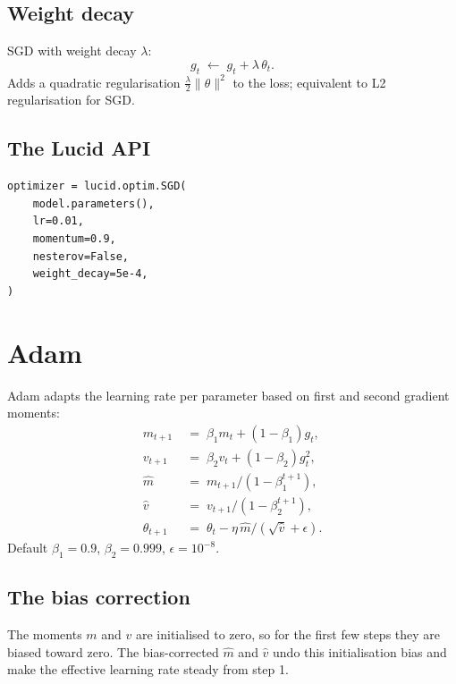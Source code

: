 \subsection{Weight decay}
\label{ssec:optimizers:weight_decay}

SGD with weight decay $\lambda$:
\[
g_t \;\leftarrow\; g_t + \lambda\, \theta_t.
\]
Adds a quadratic regularisation $\frac{\lambda}{2} \|\theta\|^2$
to the loss; equivalent to L2 regularisation for SGD.

\subsection{The Lucid API}
\label{ssec:optimizers:sgd_api}

\begin{lstlisting}[style=lucid,language=LucidPython]
optimizer = lucid.optim.SGD(
    model.parameters(),
    lr=0.01,
    momentum=0.9,
    nesterov=False,
    weight_decay=5e-4,
)
\end{lstlisting}

\section{Adam}
\label{sec:optimizers:adam}

Adam \cite{kingma_adam_2015} adapts the learning rate per
parameter based on first and second gradient moments:
\begin{align*}
m_{t+1} &\;=\; \beta_1 m_t + (1 - \beta_1) g_t, \\
v_{t+1} &\;=\; \beta_2 v_t + (1 - \beta_2) g_t^2, \\
\hat m  &\;=\; m_{t+1} / (1 - \beta_1^{t+1}), \\
\hat v  &\;=\; v_{t+1} / (1 - \beta_2^{t+1}), \\
\theta_{t+1} &\;=\; \theta_t - \eta\, \hat m / (\sqrt{\hat v} + \epsilon).
\end{align*}
Default $\beta_1 = 0.9$, $\beta_2 = 0.999$, $\epsilon = 10^{-8}$.

\subsection{The bias correction}
\label{ssec:optimizers:bias_correction}

The moments $m$ and $v$ are initialised to zero, so for the first
few steps they are biased toward zero. The bias-corrected
$\hat m$ and $\hat v$ undo this initialisation bias and make the
effective learning rate steady from step 1.

